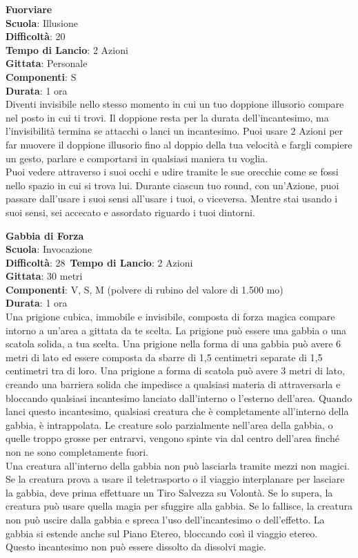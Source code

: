 \begin{multicols}{2}
\medskip\textbf{Fuorviare}\\
\textbf{Scuola}: Illusione\\
\textbf{Difficoltà}: 20\\
\textbf{Tempo di Lancio}: 2 Azioni\\
\textbf{Gittata}: Personale\\
\textbf{Componenti}: S\\
\textbf{Durata}: 1 ora\\
Diventi invisibile nello stesso momento in cui un tuo doppione illusorio compare nel posto in cui ti trovi. Il doppione resta per la durata dell'incantesimo, ma l'invisibilità termina se attacchi o lanci un incantesimo. Puoi usare 2 Azioni per far muovere il doppione illusorio fino al doppio della tua velocità e fargli compiere un gesto, parlare e comportarsi in qualsiasi maniera tu voglia.\\
Puoi vedere attraverso i suoi occhi e udire tramite le sue orecchie come se fossi nello spazio in cui si trova lui. Durante ciascun tuo round, con un'Azione, puoi passare dall'usare i suoi sensi all'usare i tuoi, o viceversa. Mentre stai usando i suoi sensi, sei accecato e assordato riguardo i tuoi dintorni. 

\medskip\textbf{Gabbia di Forza}\\
\textbf{Scuola}: Invocazione\\
\textbf{Difficoltà}: 28\
\textbf{Tempo di Lancio}: 2 Azioni\\
\textbf{Gittata}: 30 metri\\
\textbf{Componenti}: V, S, M (polvere di rubino del valore di 1.500 mo)\\
\textbf{Durata}: 1 ora\\
Una prigione cubica, immobile e invisibile, composta di forza magica compare intorno a un'area a gittata da te scelta. La prigione può essere una gabbia o una scatola solida, a tua scelta. Una prigione nella forma di una gabbia può avere 6 metri di lato ed essere composta da sbarre di 1,5 centimetri separate di 1,5 centimetri tra di loro. Una prigione a forma di scatola può avere 3 metri di lato, creando una barriera solida che impedisce a qualsiasi materia di attraversarla e bloccando qualsiasi incantesimo lanciato dall'interno o l'esterno dell'area. Quando lanci questo incantesimo, qualsiasi creatura che è completamente all'interno della gabbia, è intrappolata. Le creature solo parzialmente nell'area della gabbia, o quelle troppo grosse per entrarvi, vengono spinte via dal centro dell'area finché non ne sono completamente fuori.\\
Una creatura all'interno della gabbia non può lasciarla tramite mezzi non magici. Se la creatura prova a usare il teletrasporto o il viaggio interplanare per lasciare la gabbia, deve prima effettuare un Tiro Salvezza su Volontà. Se lo supera, la creatura può usare quella magia per sfuggire alla gabbia. Se lo fallisce, la creatura non può uscire dalla gabbia e spreca l'uso dell'incantesimo o dell'effetto. La gabbia si estende anche sul Piano Etereo, bloccando così il viaggio etereo.\\
Questo incantesimo non può essere dissolto da dissolvi magie.


\end{multicols}
